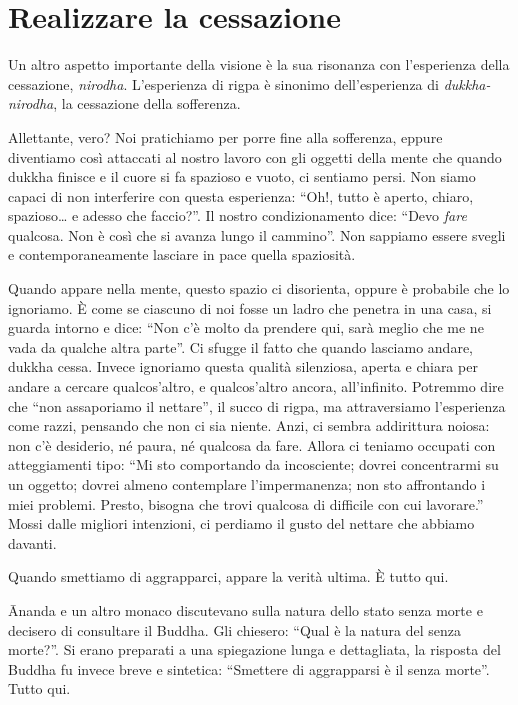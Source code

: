 \section*{Realizzare la cessazione}

Un altro aspetto importante della visione è la sua risonanza con l'esperienza della cessazione, \textit{nirodha}. L'esperienza di rigpa è sinonimo dell'esperienza di \textit{dukkha-nirodha}, la cessazione della sofferenza.

Allettante, vero? Noi pratichiamo per porre fine alla sofferenza, eppure diventiamo così attaccati al nostro lavoro con gli oggetti della mente che quando dukkha finisce e il cuore si fa spazioso e vuoto, ci sentiamo persi. Non siamo capaci di non interferire con questa esperienza: ``Oh!, tutto è aperto, chiaro, spazioso\ldots{} e adesso che faccio?''. Il nostro condizionamento dice: ``Devo \textit{fare} qualcosa. Non è così che si avanza lungo il cammino''. Non sappiamo essere svegli e contemporaneamente lasciare in pace quella spaziosità.

Quando appare nella mente, questo spazio ci disorienta, oppure è probabile che lo ignoriamo. È come se ciascuno di noi fosse un ladro che penetra in una casa, si guarda intorno e dice: ``Non c'è molto da prendere qui, sarà meglio che me ne vada da qualche altra parte''. Ci sfugge il fatto che quando lasciamo andare, dukkha cessa. Invece ignoriamo questa qualità silenziosa, aperta e chiara per andare a cercare qualcos'altro, e qualcos'altro ancora, all'infinito. Potremmo dire che ``non assaporiamo il nettare'', il succo di rigpa, ma attraversiamo l'esperienza come razzi, pensando che non ci sia niente. Anzi, ci sembra addirittura noiosa: non c'è desiderio, né paura, né qualcosa da fare. Allora ci teniamo occupati con atteggiamenti tipo: ``Mi sto comportando da incosciente; dovrei concentrarmi su un oggetto; dovrei almeno contemplare l'impermanenza; non sto affrontando i miei problemi. Presto, bisogna che trovi qualcosa di difficile con cui lavorare.'' Mossi dalle migliori intenzioni, ci perdiamo il gusto del nettare che abbiamo davanti.

Quando smettiamo di aggrapparci, appare la verità ultima. È tutto qui.

\=Ananda e un altro monaco discutevano sulla natura dello stato senza morte e decisero di consultare il Buddha. Gli chiesero: ``Qual è la natura del senza morte?''. Si erano preparati a una spiegazione lunga e dettagliata, la risposta del Buddha fu invece breve e sintetica: ``Smettere di aggrapparsi è il senza morte''. Tutto qui.

